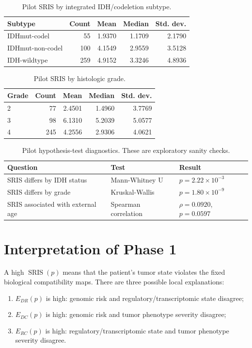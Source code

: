 \documentclass[11pt]{article}
\newcommand{\SRIS}{\operatorname{SRIS}}
\begin{document}
\begin{table}[h!]
\centering
\caption{Pilot SRIS by integrated IDH/codeletion subtype.}
\begin{tabular}{@{}lrrrr@{}}
\toprule
Subtype & Count & Mean & Median & Std. dev.\\
\midrule
IDHmut-codel & 55 & 1.9370 & 1.1709 & 2.1790\\
IDHmut-non-codel & 100 & 4.1549 & 2.9559 & 3.5128\\
IDH-wildtype & 259 & 4.9152 & 3.3246 & 4.8936\\
\bottomrule
\end{tabular}
\end{table}

\begin{table}[h!]
\centering
\caption{Pilot SRIS by histologic grade.}
\begin{tabular}{@{}lrrrr@{}}
\toprule
Grade & Count & Mean & Median & Std. dev.\\
\midrule
2 & 77 & 2.4501 & 1.4960 & 3.7769\\
3 & 98 & 6.1310 & 5.2039 & 5.0577\\
4 & 245 & 4.2556 & 2.9306 & 4.0621\\
\bottomrule
\end{tabular}
\end{table}

\begin{table}[h!]
\centering
\caption{Pilot hypothesis-test diagnostics.  These are exploratory sanity checks.}
\begin{tabular}{@{}lll@{}}
\toprule
Question & Test & Result\\
\midrule
SRIS differs by IDH status & Mann-Whitney U & $p=2.22\times 10^{-3}$\\
SRIS differs by grade & Kruskal-Wallis & $p=1.80\times 10^{-9}$\\
SRIS associated with external age & Spearman correlation & $\rho=0.0920$, $p=0.0597$\\
\bottomrule
\end{tabular}
\end{table}

\section{Interpretation of Phase 1}

A high $\SRIS(p)$ means that the patient's tumor state violates the fixed biological compatibility maps.  There are three possible local explanations:
\begin{enumerate}[leftmargin=1.2cm]
    \item $E_{DR}(p)$ is high: genomic risk and regulatory/transcriptomic state disagree;
    \item $E_{DC}(p)$ is high: genomic risk and tumor phenotype severity disagree;
    \item $E_{RC}(p)$ is high: regulatory/transcriptomic state and tumor phenotype severity disagree.
\end{enumerate}
\end{document}
